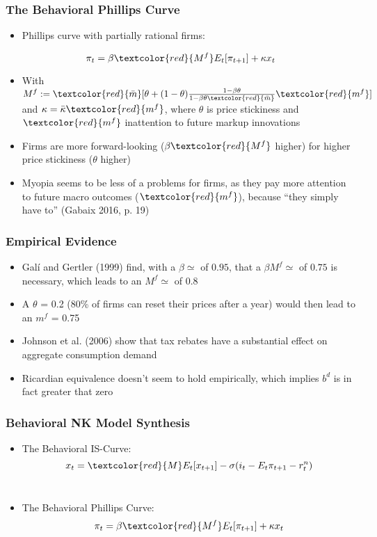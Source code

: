 \documentclass{beamer}
\begin{document}

\begin{frame}
\frametitle{The Behavioral Phillips Curve}
\begin{itemize}
\item Phillips curve with partially rational firms:
\end{itemize}
	$$\pi_{t}=\beta \textcolor{red}{M^{f}}E_{t}[\pi_{t+1}]+\kappa x_{t}$$
\begin{itemize}
\item With $M^{f}:=\textcolor{red}{\bar m}[\theta+(1-\theta)\frac{1-\beta \theta}{1-\beta \theta \textcolor{red}{\bar m}}\textcolor{red}{m^{f}}]$ and $\kappa=\bar \kappa \textcolor{red}{m^{f}}$, where $\theta$ is price stickiness and $\textcolor{red}{m^{f}}$ inattention to future markup innovations
\item Firms are more forward-looking ($\beta \textcolor{red}{ M^{f}}$ higher) for higher price stickiness ($\theta$ higher) 
\item Myopia seems to be less of a problems for firms, as they pay more attention to future macro outcomes ($\textcolor{red}{m^{f}}$),  because ``they simply have to'' (Gabaix 2016, p. 19)
\end{itemize}
\end{frame}


\begin{frame}
\frametitle{Empirical Evidence}
\begin{itemize}
\item Gal\'{i} and Gertler (1999) find, with a $\beta \simeq$ of $0.95$, that a $\beta M^{f}\simeq$ of $0.75$ is necessary, which leads to an $M^{f}\simeq$ of $0.8$
\item A $\theta$ = 0.2 (80\% of firms can reset their prices after a year) would then lead to an ${m^{f}}$ = 0.75
\item Johnson et al. (2006) show that tax rebates have a substantial effect on aggregate consumption demand
\item Ricardian equivalence doesn't seem to hold empirically, which implies $b^{d}$ is in fact greater that zero  
\end{itemize}
\end{frame}


\begin{frame}
	\frametitle{Behavioral NK Model Synthesis}
	\begin{itemize}
		\item The Behavioral IS-Curve: $$x_{t}=\textcolor{red}{M}E_{t}[x_{t+1}]-\sigma(i_{t}-E_{t}\pi_{t+1}-r_{t}^{n})$$\\
		\vspace{5pt}
		\item The Behavioral Phillips Curve: $$\pi_{t}=\beta \textcolor{red}{M^{f}}E_{t}[\pi_{t+1}]+\kappa x_{t}$$
	\end{itemize}
\end{frame}
\end{document}
